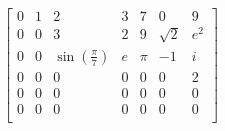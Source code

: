 \documentclass[crop=true,border=20pt,preview]{standalone}
\begin{document}
$\displaystyle
\begin{bmatrix}
0 & 1 & 2 & 3 & 7 & 0 & 9\\
0 & 0 & 3 & 2 & 9 & \sqrt{2} & e^2\\
0 & 0 & \sin\left(\frac{\pi}{7}\right) & e & \pi & -1 & i\\
0 & 0 & 0 & 0 & 0 & 0 & 2\\
0 & 0 & 0 & 0 & 0 & 0 & 0\\
0 & 0 & 0 & 0 & 0 & 0 & 0\\
\end{bmatrix}
$
\end{document}
